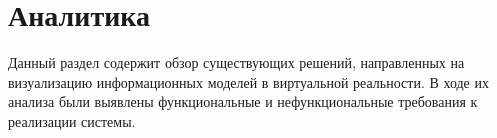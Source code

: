 ﻿\section{Аналитика}

Данный раздел содержит обзор существующих решений,
направленных на визуализацию информационных моделей в виртуальной реальности.
В ходе их анализа были выявлены функциональные и нефункциональные требования
к реализации системы. 



